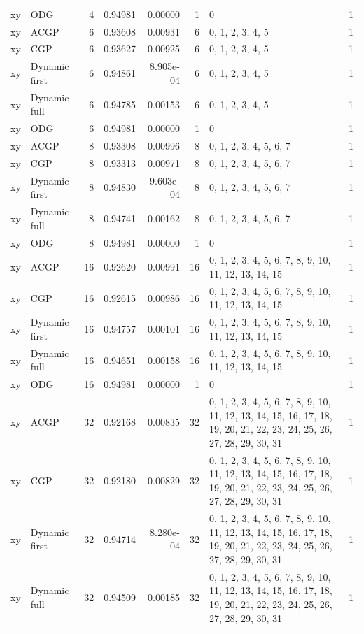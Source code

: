 \documentclass[10pt,a4paper]{article}
\begin{document}
\begin{longtable}{@{}p{23mm}p{29mm}rrrrp{36mm}r@{}}
xy & ODG & 4 & 0.94981 & 0.00000 & 1 & 0 & 1 \\
xy & ACGP & 6 & 0.93608 & 0.00931 & 6 & 0, 1, 2, 3, 4, 5 & 1 \\
xy & CGP & 6 & 0.93627 & 0.00925 & 6 & 0, 1, 2, 3, 4, 5 & 1 \\
xy & Dynamic first & 6 & 0.94861 & 8.905e-04 & 6 & 0, 1, 2, 3, 4, 5 & 1 \\
xy & Dynamic full & 6 & 0.94785 & 0.00153 & 6 & 0, 1, 2, 3, 4, 5 & 1 \\
xy & ODG & 6 & 0.94981 & 0.00000 & 1 & 0 & 1 \\
xy & ACGP & 8 & 0.93308 & 0.00996 & 8 & 0, 1, 2, 3, 4, 5, 6, 7 & 1 \\
xy & CGP & 8 & 0.93313 & 0.00971 & 8 & 0, 1, 2, 3, 4, 5, 6, 7 & 1 \\
xy & Dynamic first & 8 & 0.94830 & 9.603e-04 & 8 & 0, 1, 2, 3, 4, 5, 6, 7 & 1 \\
xy & Dynamic full & 8 & 0.94741 & 0.00162 & 8 & 0, 1, 2, 3, 4, 5, 6, 7 & 1 \\
xy & ODG & 8 & 0.94981 & 0.00000 & 1 & 0 & 1 \\
xy & ACGP & 16 & 0.92620 & 0.00991 & 16 & 0, 1, 2, 3, 4, 5, 6, 7, 8, 9, 10, 11, 12, 13, 14, 15 & 1 \\
xy & CGP & 16 & 0.92615 & 0.00986 & 16 & 0, 1, 2, 3, 4, 5, 6, 7, 8, 9, 10, 11, 12, 13, 14, 15 & 1 \\
xy & Dynamic first & 16 & 0.94757 & 0.00101 & 16 & 0, 1, 2, 3, 4, 5, 6, 7, 8, 9, 10, 11, 12, 13, 14, 15 & 1 \\
xy & Dynamic full & 16 & 0.94651 & 0.00158 & 16 & 0, 1, 2, 3, 4, 5, 6, 7, 8, 9, 10, 11, 12, 13, 14, 15 & 1 \\
xy & ODG & 16 & 0.94981 & 0.00000 & 1 & 0 & 1 \\
xy & ACGP & 32 & 0.92168 & 0.00835 & 32 & 0, 1, 2, 3, 4, 5, 6, 7, 8, 9, 10, 11, 12, 13, 14, 15, 16, 17, 18, 19, 20, 21, 22, 23, 24, 25, 26, 27, 28, 29, 30, 31 & 1 \\
xy & CGP & 32 & 0.92180 & 0.00829 & 32 & 0, 1, 2, 3, 4, 5, 6, 7, 8, 9, 10, 11, 12, 13, 14, 15, 16, 17, 18, 19, 20, 21, 22, 23, 24, 25, 26, 27, 28, 29, 30, 31 & 1 \\
xy & Dynamic first & 32 & 0.94714 & 8.280e-04 & 32 & 0, 1, 2, 3, 4, 5, 6, 7, 8, 9, 10, 11, 12, 13, 14, 15, 16, 17, 18, 19, 20, 21, 22, 23, 24, 25, 26, 27, 28, 29, 30, 31 & 1 \\
xy & Dynamic full & 32 & 0.94509 & 0.00185 & 32 & 0, 1, 2, 3, 4, 5, 6, 7, 8, 9, 10, 11, 12, 13, 14, 15, 16, 17, 18, 19, 20, 21, 22, 23, 24, 25, 26, 27, 28, 29, 30, 31 & 1 \\

\end{longtable}
\end{document}
